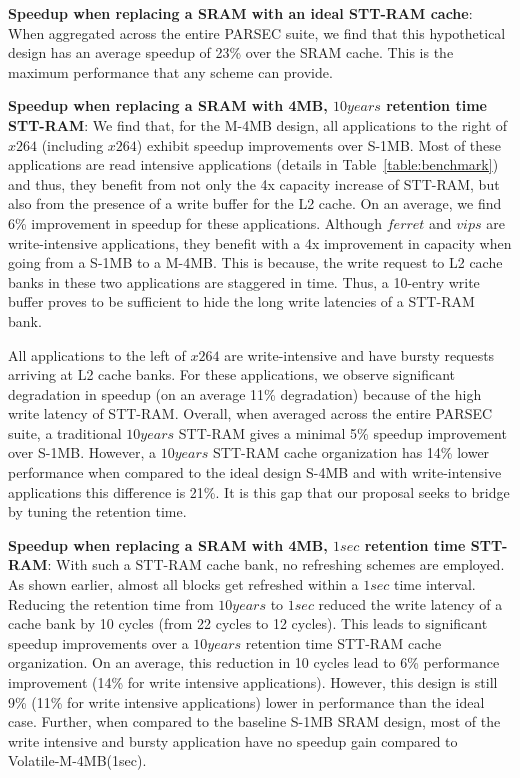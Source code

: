 {\bf Speedup when replacing a SRAM with an ideal STT-RAM cache}: When aggregated across the entire PARSEC suite, we find that this hypothetical design has an average speedup of 23\% over the SRAM cache. This is the maximum performance that any scheme can provide.

{\bf Speedup when replacing a SRAM with 4MB, $10years$ retention time STT-RAM}: We find that, for the M-4MB design, all applications to the right of $x264$ (including $x264$) exhibit speedup improvements over S-1MB. Most of these applications are read intensive applications (details in Table~\ref{table:benchmark}) and thus, they benefit from not only the 4x capacity increase of STT-RAM, but also from the presence of a write buffer for the L2 cache. On an average, we find 6\% improvement in speedup for these applications. Although $ferret$ and $vips$ are write-intensive applications, they benefit with a 4x improvement in capacity when going from a S-1MB to a M-4MB. This is because, the write request to L2 cache banks in these two applications are staggered in time. Thus, a 10-entry write buffer proves to be sufficient to hide the long write latencies of a STT-RAM bank.

All applications to the left of $x264$ are write-intensive and have bursty requests arriving at L2 cache banks. For these applications, we observe significant degradation in speedup (on an average 11\% degradation) because of the high write latency of STT-RAM.
Overall, when averaged across the entire PARSEC suite, a traditional $10years$ STT-RAM gives a minimal 5\% speedup improvement over S-1MB. However, a $10years$ STT-RAM cache organization has 14\% lower performance when compared to the ideal design S-4MB and with write-intensive applications this difference is 21\%. It is this gap that our proposal seeks to bridge by tuning the retention time.

{\bf Speedup when replacing a SRAM with 4MB, $1sec$ retention time STT-RAM}: With such a STT-RAM cache bank, no refreshing schemes are employed. As shown earlier, almost all blocks get refreshed within a $1sec$ time interval. Reducing the retention time from $10years$ to $1sec$ reduced the write latency of a cache bank by 10 cycles (from 22 cycles to 12 cycles). This leads to significant speedup improvements over a $10years$ retention time STT-RAM cache organization. On an average, this reduction in 10 cycles lead to 6\% performance improvement (14\% for write intensive applications). However, this design is still 9\% (11\% for write intensive applications) lower in performance than the ideal case.
Further, when compared to the baseline S-1MB SRAM design, most of the write intensive and bursty application have no speedup gain compared to
Volatile-M-4MB(1sec).

